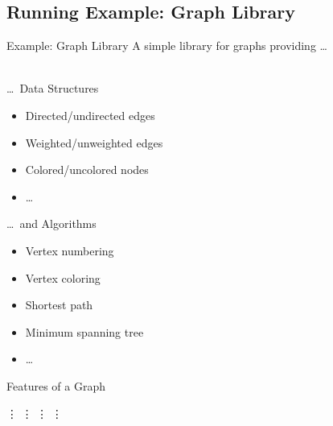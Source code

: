 \subsection{Running Example: Graph Library}


\begin{frame}{Example: Graph Library}
	A simple library for graphs providing \ldots\\~\\
	\begin{mycolumns}[t]
		\begin{example}{\ldots\ Data Structures}
			\begin{itemize}
				\item Directed/undirected edges
				\item Weighted/unweighted edges 
				\item Colored/uncolored nodes
				\item \ldots
			\end{itemize}
		\end{example}
	\mynextcolumn
		\begin{example}{\ldots\ and Algorithms}
			\begin{itemize}
				\item Vertex numbering
				\item Vertex coloring 
				\item Shortest path
				\item Minimum spanning tree 
				\item \ldots
			\end{itemize}
		\end{example}
	\end{mycolumns}
\end{frame}

\begin{frame}{Features of a Graph}
	\begin{mycolumns}[t,columns=4]
		\centering\Huge\vdots
	\mynextcolumn
		\centering\Huge\vdots
	\mynextcolumn
		\centering\Huge\vdots
	\mynextcolumn
		\centering\Huge\vdots
	\end{mycolumns}
\end{frame}

